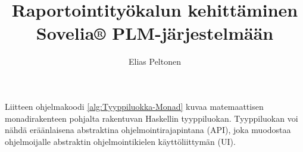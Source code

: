 \documentclass[language=finnish,version=final,mainfont=none,sharelatex=false]{utuftthesis}
\providecommand{\algorithmname}{Algoritmi}
\begin{document}
\title{Raportointityökalun kehittäminen Sovelia® PLM-järjestelmään}
\author{Elias Peltonen}

\maketitle


\tableofcontents

\listoffigures

\listoftables

\listofacronyms

\renewcommand{\algorithmname}{\listingscaption}


\begin{comment}
To better organize things, create a new tex file for each chapter
and input it below.

Avoid using the å, ä, ö or <space> characters in referred names and
underscores \_ in file names (may break hyperref).

Good luck! Thanks.
\end{comment}



%
%


\printbibliography

\begin{comment}
Important! Create the appendix chapters with command \textbackslash appchapter\{some
name\} instead of \textbackslash chapter\{some name\} for the automagic
page counting to work!
\end{comment}



Liitteen ohjelmakoodi \ref{alg:Tyyppiluokka-Monad} kuvaa matemaattisen
monadirakenteen pohjalta rakentuvan Haskellin tyyppiluokan. Tyyppiluokan
voi nähdä eräänlaisena abstraktina ohjelmointirajapintana (API),
joka muodostaa ohjelmoijalle abstraktin ohjelmointikielen käyttöliittymän
(UI). 
\end{document}
